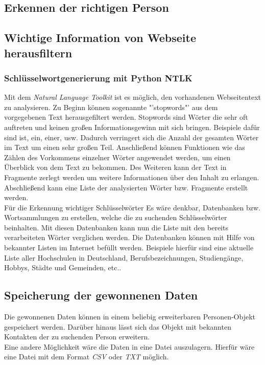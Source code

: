  	\subsection{Erkennen der richtigen Person}
 	\subsection{Wichtige Information von Webseite herausfiltern}
		\subsubsection{Schlüsselwortgenerierung mit Python NTLK}
		Mit dem \textit{Natural Language Toolkit} ist es möglich, den vorhandenen Webseitentext zu analysieren. Zu Beginn können sogenannte "'stopwords"' aus dem vorgegebenen Text herausgefiltert werden. Stopwords sind Wörter die sehr oft auftreten und keinen großen Informationsgewinn mit sich bringen. Beispiele dafür sind ist, ein, einer, usw. Dadurch verringert sich die Anzahl der gesamten Wörter im Text um einen sehr großen Teil. Anschließend können Funktionen wie das Zählen des Vorkommens einzelner Wörter angewendet werden, um einen Überblick von dem Text zu bekommen. Des Weiteren kann der Text in Fragmente zerlegt werden um weitere Informationen über den Inhalt zu erlangen. Abschließend kann eine Liste der analysierten Wörter bzw. Fragmente erstellt werden.\\
		Für die Erkennung wichtiger Schlüsselwörter
		Es wäre denkbar, Datenbanken bzw. Wortsammlungen zu erstellen, welche die zu suchenden Schlüsselwörter beinhalten. Mit diesen Datenbanken kann nun die Liste mit den bereits verarbeiteten Wörter verglichen werden. Die Datenbanken können mit Hilfe von bekannter Listen im Internet befüllt werden. Beispiele hierfür sind eine aktuelle Liste aller Hochschulen in Deutschland, Berufsbezeichnungen, Studiengänge, Hobbys, Städte und Gemeinden, etc..

	\subsection{Speicherung der gewonnenen Daten}
	Die gewonnenen Daten können in einem beliebig erweiterbaren Personen-Objekt gespeichert werden. Darüber hinaus lässt sich das Objekt mit bekannten Kontakten der zu suchenden Person erweitern.\\
	Eine andere Möglichkeit wäre die Daten in eine Datei auszulagern. Hierfür wäre eine Datei mit dem Format \textit{CSV} oder \textit{TXT} möglich.
		
